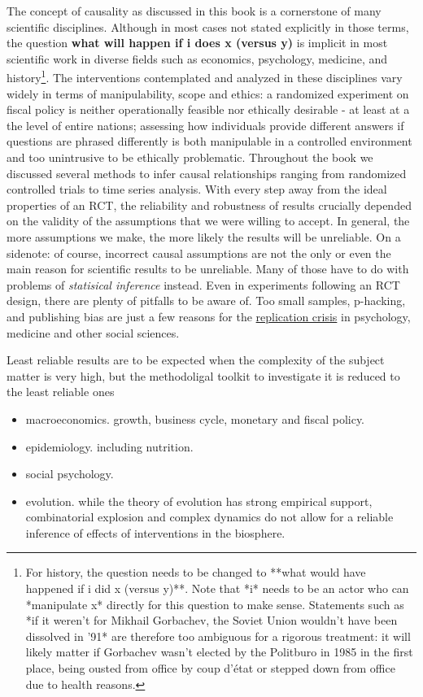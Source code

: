 \documentclass[
]{book}
\providecommand{\tightlist}{%
  \setlength{\itemsep}{0pt}\setlength{\parskip}{0pt}}
\theoremstyle{definition}
\theoremstyle{definition}
\theoremstyle{definition}
\theoremstyle{remark}
\begin{document}
The concept of causality as discussed in this book is a cornerstone of many scientific disciplines. Although in most cases not stated explicitly in those terms, the question \textbf{what will happen if i does x (versus y)} is implicit in most scientific work in diverse fields such as economics, psychology, medicine, and history\footnote{For history, the question needs to be changed to **what would have happened if i did x (versus y)**. Note that *i* needs to be an actor who can *manipulate x* directly for this question to make sense. Statements such as *if it weren't for Mikhail Gorbachev, the Soviet Union wouldn't have been dissolved in '91* are therefore too ambiguous for a rigorous treatment: it will likely matter if Gorbachev wasn't elected by the Politburo in 1985 in the first place, being ousted from office by coup d'état or stepped down from office due to health reasons.}.
The interventions contemplated and analyzed in these disciplines vary widely in terms of manipulability, scope and ethics: a randomized experiment on fiscal policy is neither operationally feasible nor ethically desirable - at least at a the level of entire nations; assessing how individuals provide different answers if questions are phrased differently is both manipulable in a controlled environment and too unintrusive to be ethically problematic. Throughout the book we discussed several methods to infer causal relationships ranging from randomized controlled trials to time series analysis. With every step away from the ideal properties of an RCT, the reliability and robustness of results crucially depended on the validity of the assumptions that we were willing to accept. In general, the more assumptions we make, the more likely the results will be unreliable.
On a sidenote: of course, incorrect causal assumptions are not the only or even the main reason for scientific results to be unreliable. Many of those have to do with problems of \emph{statisical inference} instead. Even in experiments following an RCT design, there are plenty of pitfalls to be aware of. Too small samples, p-hacking, and publishing bias are just a few reasons for the \href{https://en.wikipedia.org/wiki/Replication_crisis}{replication crisis} in psychology, medicine and other social sciences.

Least reliable results are to be expected when the complexity of the subject matter is very high, but the methodoligal toolkit to investigate it is reduced to the least reliable ones

\begin{itemize}
\tightlist
\item
  macroeconomics. growth, business cycle, monetary and fiscal policy.
\item
  epidemiology. including nutrition.
\item
  social psychology.
\item
  evolution. while the theory of evolution has strong empirical support, combinatorial explosion and complex dynamics do not allow for a reliable inference of effects of interventions in the biosphere.
\end{itemize}
\end{document}
